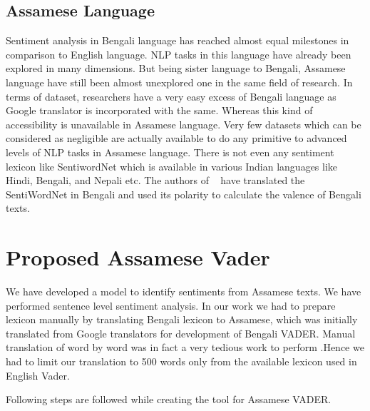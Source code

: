 \documentclass[conference]{IEEEtran}
\begin{document}
\subsection {Assamese Language}
Sentiment analysis in Bengali language has reached almost equal milestones in comparison to English language. NLP tasks in this language have already been explored in many dimensions. But being sister language to Bengali, Assamese language have still been almost unexplored one in the same field of research. In terms of dataset, researchers have a very easy excess of Bengali language as Google translator is incorporated with the same. Whereas this kind of accessibility is unavailable in Assamese language. Very few datasets which can be considered as negligible are actually available to do any primitive to advanced levels of NLP tasks in Assamese language. There is not even any sentiment lexicon like SentiwordNet which is available in various Indian languages like Hindi, Bengali, and Nepali etc. The authors of ~\cite{b18} have translated the SentiWordNet in Bengali and used its polarity to calculate the valence of Bengali texts.

\section{Proposed Assamese Vader}
We have developed a model to identify sentiments from Assamese texts. We have performed sentence level sentiment analysis. In our work we had to prepare lexicon manually by translating Bengali lexicon to Assamese, which was initially translated from Google translators for development of Bengali VADER. Manual translation of word by word was in fact a very tedious work to perform .Hence we had to limit our translation to 500 words only from the available lexicon used in English Vader.

Following steps are followed while creating the tool for Assamese VADER.
\end{document}
